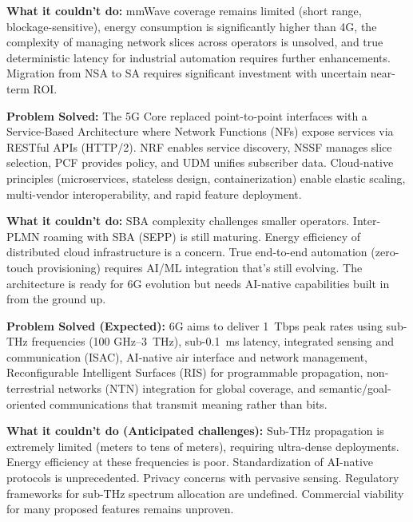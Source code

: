 \textbf{What it couldn’t do:} mmWave coverage remains limited (short range, blockage-sensitive), energy consumption is significantly higher than 4G, the complexity of managing network slices across operators is unsolved, and true deterministic latency for industrial automation requires further enhancements. Migration from NSA to SA requires significant investment with uncertain near-term ROI.


\textbf{Problem Solved:} The 5G Core replaced point-to-point interfaces with a Service-Based Architecture where Network Functions (NFs) expose services via RESTful APIs (HTTP/\allowbreak{}2). NRF enables service discovery, NSSF manages slice selection, PCF provides policy, and UDM unifies subscriber data. Cloud-native principles (microservices, stateless design, containerization) enable elastic scaling, multi-vendor interoperability, and rapid feature deployment.

\textbf{What it couldn’t do:} SBA complexity challenges smaller operators. Inter-PLMN roaming with SBA (SEPP) is still maturing. Energy efficiency of distributed cloud infrastructure is a concern. True end-to-end automation (zero-touch provisioning) requires AI/\allowbreak{}ML integration that’s still evolving. The architecture is ready for 6G evolution but needs AI-native capabilities built in from the ground up.


\textbf{Problem Solved (Expected):} 6G aims to deliver 1~Tbps peak rates using sub-THz frequencies (100 GHz–3~THz), sub-0.1~ms latency, integrated sensing and communication (ISAC), AI-native air interface and network management, Reconfigurable Intelligent Surfaces (RIS) for programmable propagation, non-terrestrial networks (NTN) integration for global coverage, and semantic/\allowbreak{}goal-oriented communications that transmit meaning rather than bits.

\textbf{What it couldn’t do (Anticipated challenges):} Sub-THz propagation is extremely limited (meters to tens of meters), requiring ultra-dense deployments. Energy efficiency at these frequencies is poor. Standardization of AI-native protocols is unprecedented. Privacy concerns with pervasive sensing. Regulatory frameworks for sub-THz spectrum allocation are undefined. Commercial viability for many proposed features remains unproven.

